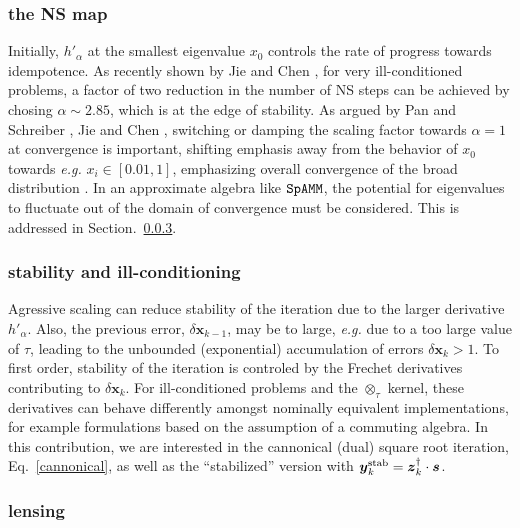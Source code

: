 \documentclass[letterpaper,twocolumn,amsmath,amsfont,amssymb,english,aps,jcp,preprintnumbers,groupaddress,nofootinbib,tightenlines]{revtex4}
\newcommand{\mat}[1]{\boldsymbol{#1}}
\newcommand{\ot}{ {\scriptstyle \otimes}_{ \tau } }
\begin{document}
\subsubsection{the NS map}
Initially, $h'_\alpha$ at the smallest eigenvalue $x_0$ controls the rate of progress towards idempotence.  
As recently shown by Jie and Chen \cite{Chen2014}, for very ill-conditioned problems, a factor of two reduction in the number of NS steps can be achieved 
by chosing $\alpha \sim 2.85$, which is at the edge of stability.   As argued by Pan and Schreiber \cite{Pan1991},
Jie and Chen \cite{Chen2014}, switching or damping the scaling factor towards $\alpha=1$ at convergence is important, shifting emphasis away from the 
behavior of $x_0$ towards {\em e.g.} $x_i \in [0.01,1]$, emphasizing overall convergence of the broad distribution \cite{Pan and Scriber}. 
In an approximate algebra like $\tt SpAMM$, the potential for eigenvalues to fluctuate out of the domain of convergence must be considered.
This is addressed in Section.~\ref{}. 

\subsubsection{stability and ill-conditioning}

Agressive scaling can reduce stability of the iteration due to the larger derivative $h'_\alpha$.  Also, the previous error, 
$\delta \mat{x}_{k-1}$, may be to large, {\em e.g.} due to a too large value of $\tau$,  leading to 
the unbounded (exponential) accumulation of errors $\delta \mat{x}_k > 1 $.  To first order, stability of the 
iteration is controled by the Frechet derivatives contributing to $\delta \mat{x}_k$.    For ill-conditioned problems
and the $\ot$ kernel, these derivatives can behave differently amongst nominally equivalent implementations, for example 
formulations based on the assumption of a commuting algebra.  In this contribution, we are interested in the
cannonical (dual) square root iteration, Eq.~\ref{cannonical}, as well as the ``stabilized'' version 
with $\mat{y}^{\rm stab}_k = \mat{z}^\dagger_k \cdot \mat{s}$.  


\subsubsection{lensing}
\end{document}

